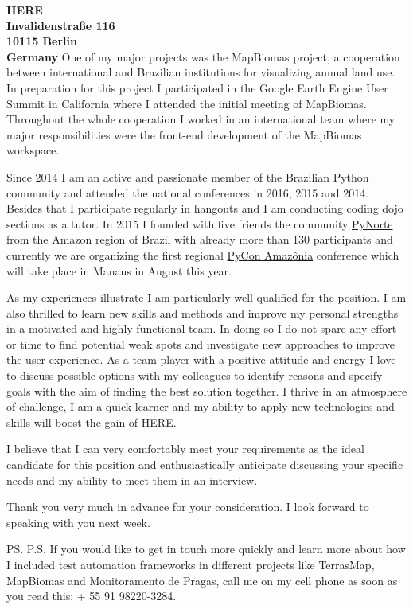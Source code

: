 \documentclass[a4paper]{joaosoares-letter}
\begin{document}
\begin{letter}{\bfseries HERE\\Invalidenstraße 116\\10115 Berlin\\Germany}
One of my major projects was the MapBiomas project, a cooperation between international and Brazilian institutions for visualizing annual land use. In preparation for this project I participated in the Google Earth Engine User Summit in California where I attended the initial meeting of MapBiomas. Throughout the whole cooperation I worked in an international team where my major responsibilities were the front-end development of the MapBiomas workspace.

Since 2014 I am an active and passionate member of the Brazilian Python community and attended the national conferences in 2016, 2015 and 2014. Besides that I participate regularly in hangouts and I am conducting coding dojo sections as a tutor. In 2015 I founded with five friends the community \href{http://pynorte.python.org.br}{PyNorte} from the Amazon region of Brazil with already more than 130 participants and currently we are organizing the first regional \href{http://amazonia.python.org.br/}{PyCon Amazônia} conference which will take place in Manaus in August this year.

As my experiences illustrate I am particularly well-qualified for the position. I am also thrilled to learn new skills and methods and improve my personal strengths in a motivated and highly functional team. In doing so I do not spare any effort or time to find potential weak spots and investigate new approaches to improve the user experience. As a team player with a positive attitude and energy I love to discuss possible options with my colleagues to identify reasons and specify goals with the aim of finding the best solution together. I thrive in an atmosphere of challenge, I am a quick learner and my ability to apply new technologies and skills will boost the gain of HERE.

I believe that I can very comfortably meet your requirements as the ideal candidate for this position and enthusiastically anticipate discussing your specific needs and my ability to meet them in an interview.


\closing{Thank you very much in advance for your consideration. I look forward to speaking with you next week.}
\vspace{10pt}
\ps
P.S. If you would like to get in touch more quickly and learn more about how I included test automation frameworks in different projects like TerrasMap, MapBiomas and Monitoramento de Pragas, call me on my cell phone as soon as you read this: + 55 91 98220-3284.
\vspace{\fill}

\end{letter}
\end{document}
